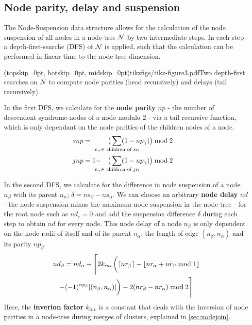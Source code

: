 \subsection{Node parity, delay and suspension}\label{sec:paritydelaysus}

The Node-Suspension data structure allows for the calculation of the node suspension of all nodes in a node-tree $\mathcal{N}$ by two intermediate steps. In each step a depth-first-searche (DFS) of $\mathcal{N}$ is applied, such that the calculation can be performed in linear time to the node-tree dimension.

\Figure[b](topskip=0pt, botskip=0pt, midskip=0pt){tikzfigs/tikz-figure3.pdf}{Two depth-first searches on $\mathcal{N}$ to compute node parities (head recursively) and delays (tail recursively).\label{fig3}}

In the first DFS, we calculate for the \textbf{node parity} $np$ - the number of descendent syndrome-nodes of a node modulo 2 - via a tail recursive function, which is only dependant on the node parities of the children nodes of a node.
\begin{align}\label{eq:nodeparity}
    snp &= &\big( \sum_{\mathclap{n_\gamma \in \text{ children of } sn}} (1-np_\gamma) \big ) \bmod 2 \hspace{1em}  \\
    jnp &= 1 - &\big(\sum_{\mathclap{n_\gamma \in \text{ children of } jn}} (1-np_\gamma) \big) \bmod 2 \hspace{1em}
\end{align}

In the second DFS, we calculate for the difference in node suspension of a node $n_\beta$ with its parent $n_\alpha$; $\delta = ns_\beta - ns_\alpha$. We can choose an arbitrary \textbf{node delay} $nd$ - the node suspension minus the maximum node suspension in the node-tree - for the root node such as $nd_r=0$ and add the suspension difference $\delta$ during each step to obtain $nd$ for every node. This node delay of a node $n_\beta$ is only dependent on the node radii of itself and of its parent $n_\alpha$, the length of edge $(n_\beta, n_\alpha)$ and its parity $np_\beta$. 
\begin{multline}\label{eq:delayequation}
    nd_\beta = nd_\alpha + \Bigg \lceil 2k_{inv}\bigg(\ceil{nr_\beta} - \floor{nr_\alpha + nr_\beta \bmod 1}\\
    - (-1)^{np_\beta}\abs{(n_\beta,n_\alpha)}\bigg) - 2(nr_\beta - nr_\alpha) \bmod2 \Bigg \rceil
\end{multline}
Here, the \textbf{inverion factor} $k_{inv}$ is a constant that deals with the inversion of node parities in a node-tree during merges of clusters, explained in \ref{sec:nodejoin}. 

